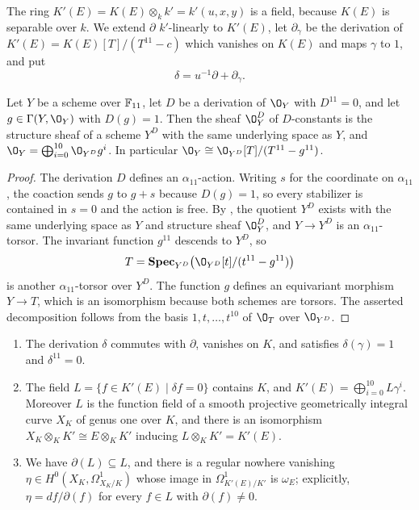 The ring $K'(E) = K(E)\otimes_kk' = k'(u,x,y)$ is a field, because $K(E)$ is separable over $k$.
We extend $\partial$ $k'$-linearly to $K'(E)$, let $\partial_\gamma$ be the derivation of $K'(E) = K(E)[T]/(T^{11}-c)$ which vanishes on $K(E)$ and maps $\gamma$ to $1$, and put
\[
  \delta = u^{-1}\partial+\partial_\gamma.
\]

\begin{lemma}\label{lem:p11-quotient}
Let $Y$ be a scheme over $\mathbb{F}_{11}$, let $D$ be a derivation of $\O_Y$ with $D^{11} = 0$, and let $g\in\Gamma(Y,\O_Y)$ with $D(g) = 1$.
Then the sheaf $\O_Y^D$ of $D$-constants is the structure sheaf of a scheme $Y^D$ with the same underlying space as $Y$, and $\O_Y = \bigoplus_{i=0}^{10}\O_{Y^D}g^i$.
In particular $\O_Y\cong\O_{Y^D}[T]/(T^{11}-g^{11})$.
\end{lemma}

\begin{proof}
The derivation $D$ defines an $\alpha_{11}$-action.
Writing $s$ for the coordinate on $\alpha_{11}$, the coaction sends $g$ to $g+s$ because $D(g) = 1$, so every stabilizer is contained in $s = 0$ and the action is free.
By \cite[Proposition~1.1 and Section~2]{Sch07K}, the quotient $Y^D$ exists with the same underlying space as $Y$ and structure sheaf $\O_Y^D$, and $Y\to Y^D$ is an $\alpha_{11}$-torsor.
The invariant function $g^{11}$ descends to $Y^D$, so
\[
  T = \operatorname{\mathbf{Spec}}_{Y^D}
  \bigl(\O_{Y^D}[t]/(t^{11}-g^{11})\bigr)
\]
is another $\alpha_{11}$-torsor over $Y^D$.
The function $g$ defines an equivariant morphism $Y\to T$, which is an isomorphism because both schemes are torsors.
The asserted decomposition follows from the basis $1,t,\ldots,t^{10}$ of $\O_T$ over $\O_{Y^D}$.
\end{proof}

\begin{lemma}\label{lem:p11-curve}
\begin{enumerate}
\item The derivation $\delta$ commutes with $\partial$, vanishes on $K$, and satisfies $\delta(\gamma) = 1$ and $\delta^{11} = 0$.
\item The field $L = \{f\in K'(E)\mid\delta f = 0\}$ contains $K$, and $K'(E) = \bigoplus_{i=0}^{10}L\gamma^i$.
  Moreover $L$ is the function field of a smooth projective geometrically integral curve $X_K$ of genus one over $K$, and there is an isomorphism $X_K\otimes_KK'\cong E\otimes_KK'$ inducing $L\otimes_KK' = K'(E)$.
\item We have $\partial(L)\subseteq L$, and there is a regular nowhere vanishing $\eta\in H^0(X_K,\Omega^1_{X_K/K})$ whose image in $\Omega^1_{K'(E)/K'}$ is $\omega_E$; explicitly, $\eta = df/\partial(f)$ for every $f\in L$ with $\partial(f)\neq 0$.
\end{enumerate}
\end{lemma}

